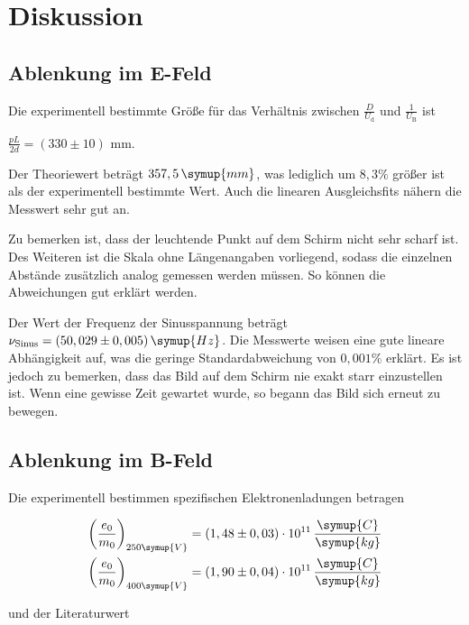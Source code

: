 \section{Diskussion}
\label{sec:Diskussion}

\subsection{Ablenkung im E-Feld}

Die experimentell bestimmte Größe für das Verhältnis zwischen $\frac{D}{U_\text{d}}$ und $\frac{1}{U_\text{B}}$ ist 

\begin{center}
    $\frac{p L }{2 d} = (330 \pm 10)$ mm.
\end{center}

Der Theoriewert beträgt $357,5 \, \symup{mm}$, was lediglich um $8,3 \%$ größer ist als der experimentell bestimmte Wert.
Auch die linearen Ausgleichsfits nähern die Messwert sehr gut an.

Zu bemerken ist, dass der leuchtende Punkt auf dem Schirm nicht sehr scharf ist.
Des Weiteren ist die Skala ohne Längenangaben vorliegend, sodass die einzelnen Abstände zusätzlich analog gemessen werden müssen.
So können die Abweichungen gut erklärt werden.

Der Wert der Frequenz der Sinusspannung beträgt $\nu_\text{Sinus} = (50,029 \pm 0,005) \, \symup{Hz}$.
Die Messwerte weisen eine gute lineare Abhängigkeit auf, was die geringe Standardabweichung von $0,001 \%$ erklärt.
Es ist jedoch zu bemerken, dass das Bild auf dem Schirm nie exakt starr einzustellen ist. Wenn eine gewisse Zeit gewartet wurde,
so begann das Bild sich erneut zu bewegen.



\subsection{Ablenkung im B-Feld}

Die experimentell bestimmen spezifischen Elektronenladungen betragen

\begin{align*}
  \bigg( \frac{e_0}{m_0} \bigg)_{250 \symup{V}} &= (1,48 \pm 0,03) \cdot 10^{11} \, \frac{\symup{C}}{\symup{kg}} \\
  \bigg( \frac{e_0}{m_0} \bigg)_{400 \symup{V}} &= (1,90 \pm 0,04) \cdot 10^{11} \, \frac{\symup{C}}{\symup{kg}}
\end{align*}

und der Literaturwert

